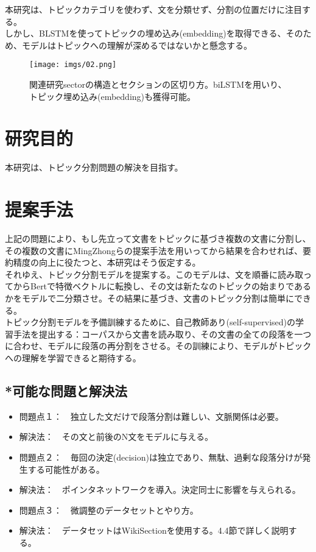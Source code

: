 \documentclass[a4paper]{article}
\begin{document}
本研究は、トピックカテゴリを使わず、文を分類せず、分割の位置だけに注目する。\\

しかし、BLSTMを使ってトピックの埋め込み(embedding)を取得できる、そのため、モデルはトピックへの理解が深めるではないかと懸念する。\\

\begin{figure}
  \texttt{[image: imgs/02.png]}
  \caption{関連研究sectorの構造とセクションの区切り方。biLSTMを用いり、トピック埋め込み(embedding)も獲得可能。}
  \label{fig:img2}
\end{figure}

\section{研究目的}

本研究は、トピック分割問題の解決を目指す。\\

\section{提案手法}

上記の問題により、もし先立って文書をトピックに基づき複数の文書に分割し、その複数の文書にMingZhongらの提案手法を用いってから結果を合わせれば、要約精度の向上に役たつと、本研究はそう仮定する。\\

それゆえ、トピック分割モデルを提案する。このモデルは、文を順番に読み取ってからBertで特徴ベクトルに転換し、その文は新たなのトピックの始まりであるかをモデルで二分類させ。その結果に基づき、文書のトピック分割は簡単にできる。\\

トピック分割モデルを予備訓練するために、自己教師あり(self-supervised)の学習手法を提出する：コーパスから文書を読み取り、その文書の全ての段落を一つに合わせ、モデルに段落の再分割をさせる。その訓練により、モデルがトピックへの理解を学習できると期待する。\\

\subsection{*可能な問題と解決法}
\begin{itemize}
\item 問題点１：　独立した文だけで段落分割は難しい、文脈関係は必要。
\item 解決法：　その文と前後のN文をモデルに与える。
\item 問題点２：　毎回の決定(decision)は独立であり、無駄、過剰な段落分けが発生する可能性がある。
\item 解決法：　ポインタネットワークを導入。決定同士に影響を与えられる。
\item 問題点３：　微調整のデータセットとやり方。
\item 解決法：　データセットはWikiSectionを使用する。4.4節で詳しく説明する。


\end{itemize}
\end{document}
